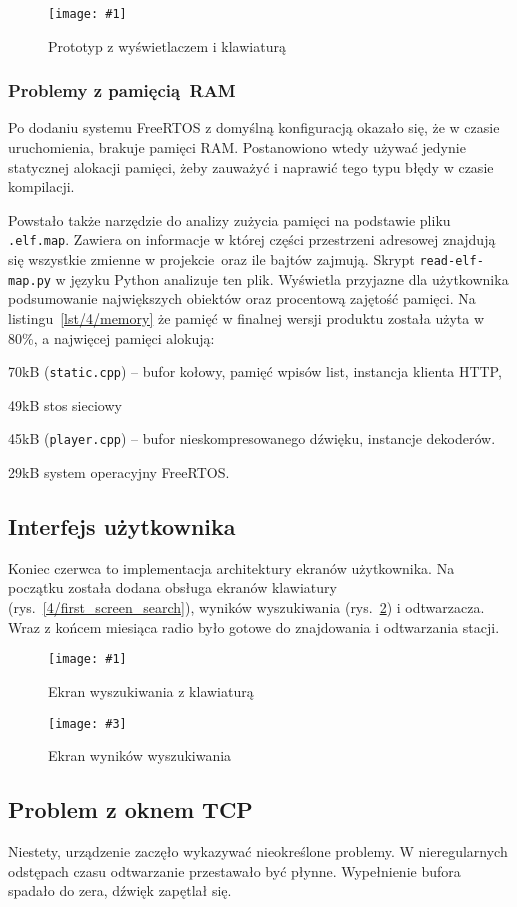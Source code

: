 \documentclass[polish]{aghengthesis}
\let\tempone\itemize
\let\temptwo\enditemize
\renewenvironment{itemize}{\tempone\setlength{\itemsep}{0cm}}{\temptwo}
\newcommand{\imgint}[4]{
	\begin{figure}[{#4}]
		\centering
		\texttt{[image: \#1]}
		\caption{#2}
		\label{#1}
	\end{figure}
}
\newcommand{\imgh}[3]{\imgint{#1}{#2}{#3}{H}}
\newcommand{\imgintss}[5]{
	\begin{figure}[{#5}]
		\centering
		\begin{minipage}{.45\textwidth}
			\centering
			\texttt{[image: \#1]}
			\caption{#2}
			\label{#1}
		\end{minipage}%
		\hfill
		\begin{minipage}{.45\textwidth}
			\centering
			\texttt{[image: \#3]}
			\caption{#4}
			\label{#3}
		\end{minipage}
	\end{figure}
}
\newcommand{\imghss}[4]{\imgintss{#1}{#2}{#3}{#4}{H}}
\newcommand{\lstfile}[3]{
	\noindent
	\hspace{0.1\linewidth}
	\begin{minipage}{0.8\linewidth}
		
	\end{minipage}
	\vspace{0.3cm}
}
\begin{document}
			\imgh{4/prototype_2}{Prototyp z wyświetlaczem i klawiaturą}{0.8}
			
			\subsubsection{Problemy z pamięcią RAM}
				Po dodaniu systemu FreeRTOS z domyślną konfiguracją okazało się, że w czasie uruchomienia, brakuje pamięci RAM.
				Postanowiono wtedy używać jedynie statycznej alokacji pamięci, żeby zauważyć i naprawić tego typu błędy w czasie kompilacji.

				Powstało także narzędzie do analizy zużycia pamięci na podstawie pliku \lstinline|.elf.map|. Zawiera on informacje w której części przestrzeni adresowej znajdują się wszystkie zmienne w projekcie oraz ile bajtów zajmują. Skrypt \lstinline|read-elf-map.py| w języku Python analizuje ten plik. Wyświetla przyjazne dla użytkownika podsumowanie największych obiektów oraz procentową zajętość pamięci. Na listingu~\ref{lst/4/memory} że pamięć w finalnej wersji produktu została użyta w 80\%, a najwięcej pamięci alokują:
				\begin{itemize}
					\item 70kB (\lstinline|static.cpp|) -- bufor kołowy, pamięć wpisów list, instancja klienta HTTP,
					\item 49kB stos sieciowy
					\item 45kB (\lstinline|player.cpp|) -- bufor nieskompresowanego dźwięku, instancje dekoderów.
					\item 29kB system operacyjny FreeRTOS.
				\end{itemize}
				
				\lstfile{default}{Zajętość pamięci RAM}{lst/4/memory}
			
		\subsection{Interfejs użytkownika}
			Koniec czerwca to implementacja architektury ekranów użytkownika. Na początku została dodana obsługa ekranów klawiatury (rys.~\ref{4/first_screen_search}), wyników wyszukiwania (rys.~\ref{4/first_screen_res}) i odtwarzacza. Wraz z końcem miesiąca radio było gotowe do znajdowania i odtwarzania stacji.
			
			\imghss{4/first_screen_search}{Ekran wyszukiwania z klawiaturą}{4/first_screen_res}{Ekran wyników wyszukiwania}
			
		\subsection{Problem z oknem TCP}
			Niestety, urządzenie zaczęło wykazywać nieokreślone problemy. W nieregularnych odstępach czasu odtwarzanie przestawało być płynne. Wypełnienie bufora spadało do zera, dźwięk zapętlał się.
			$ $\\
			
\end{document}

